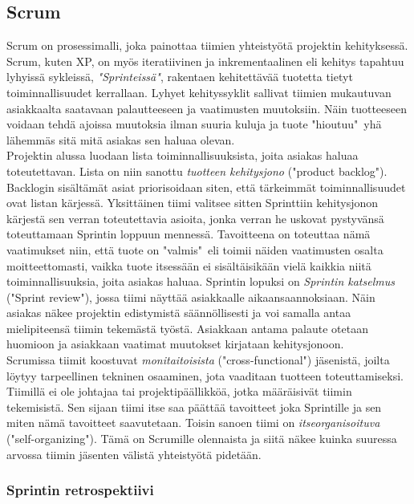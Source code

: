 \documentclass[finnish]{../tktltiki2}
\theoremstyle{definition}
\theoremstyle{remark}
\begin{document}
\subsection{Scrum}

Scrum on prosessimalli, joka painottaa tiimien yhteistyötä projektin kehityksessä. Scrum, kuten XP, on myös iteratiivinen ja inkrementaalinen
eli kehitys tapahtuu lyhyissä sykleissä, \emph{"Sprinteissä"}, rakentaen kehitettävää tuotetta tietyt toiminnallisuudet kerrallaan. Lyhyet kehityssyklit sallivat tiimien mukautuvan asiakkaalta saatavaan palautteeseen ja vaatimusten muutoksiin. Näin tuotteeseen voidaan tehdä ajoissa
muutoksia ilman suuria kuluja ja tuote "hioutuu"~yhä lähemmäs sitä mitä asiakas sen haluaa olevan.\\

Projektin alussa luodaan lista toiminnallisuuksista,
joita asiakas haluaa toteutettavan. Lista on niin sanottu \emph{tuotteen kehitysjono} ("product backlog"). Backlogin sisältämät asiat priorisoidaan siten, että tärkeimmät toiminnallisuudet ovat listan kärjessä. Yksittäinen tiimi valitsee sitten Sprinttiin kehitysjonon kärjestä sen verran
toteutettavia asioita, jonka verran he uskovat pystyvänsä toteuttamaan Sprintin loppuun mennessä. Tavoitteena on toteuttaa nämä vaatimukset niin,
että tuote on "valmis"~eli toimii näiden vaatimusten osalta moitteettomasti, vaikka tuote itsessään ei sisältäisikään vielä kaikkia niitä
toiminnallisuuksia, joita asiakas haluaa. Sprintin lopuksi on \emph{Sprintin katselmus} ("Sprint review"), jossa tiimi näyttää asiakkaalle
aikaansaannoksiaan. Näin asiakas näkee projektin edistymistä säännöllisesti ja voi samalla antaa mielipiteensä tiimin tekemästä työstä. Asiakkaan
antama palaute otetaan huomioon ja asiakkaan vaatimat muutokset kirjataan kehitysjonoon.\\

Scrumissa tiimit koostuvat \emph{monitaitoisista} ("cross-functional") jäsenistä, joilta löytyy tarpeellinen tekninen osaaminen, jota vaaditaan
tuotteen toteuttamiseksi. Tiimillä ei ole johtajaa tai projektipäällikköä, jotka määräisivät tiimin tekemisistä. Sen sijaan tiimi itse
saa päättää tavoitteet joka Sprintille ja sen miten nämä tavoitteet saavutetaan. Toisin sanoen tiimi on \emph{itseorganisoituva}
("self-organizing"). Tämä on Scrumille olennaista ja siitä näkee kuinka suuressa arvossa tiimin jäsenten välistä yhteistyötä pidetään.

\subsubsection{Sprintin retrospektiivi}
\end{document}
